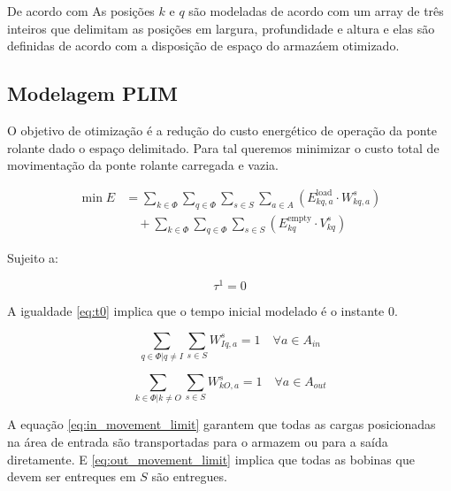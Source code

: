 \documentclass[journal]{IEEEtran}
\begin{document}
        De acordo com \cite{YUAN2017424} As posições $k$ e $q$ são modeladas de 
        acordo com um array de três inteiros que delimitam as posições em largura,
        profundidade e altura e elas são definidas de acordo com a disposição de
        espaço do armazáem otimizado. 

        \subsection{Modelagem PLIM}

        O objetivo de otimização é a redução do custo energético de operação da 
        ponte rolante dado o espaço delimitado. Para tal queremos minimizar o 
        custo total de movimentação da ponte rolante carregada e vazia.

        \begin{align*}
            \min E &= \sum_{k \in \Phi} \sum_{q \in \Phi} \sum_{s \in S} \sum_{a \in A} 
                    \left( E_{kq,a}^{\text{load}} \cdot W_{kq,a}^s \right) \\
                &\quad + \sum_{k \in \Phi} \sum_{q \in \Phi} \sum_{s \in S} 
                    \left( E_{kq}^{\text{empty}} \cdot V_{kq}^s \right)
            \label{eq:objetivo}
        \end{align*}


        Sujeito a:

        \begin{equation}
            \tau^{1} = 0
            \label{eq:t0}
        \end{equation}

        A igualdade \ref{eq:t0} implica que o tempo inicial modelado é o instante 0.

        \begin{equation}
            \sum_{q \in \Phi | q \neq I} \sum_{s \in S} W^s_{Iq,a} = 1 \quad \forall a \in A_{in} 
            \label{eq:in_movement_limit}
        \end{equation}

        \begin{equation}
            \sum_{k \in \Phi | k \neq O} \sum_{s \in S} W^s_{kO,a} = 1 \quad \forall a \in A_{out}
            \label{eq:out_movement_limit}
        \end{equation}

        A equação \ref{eq:in_movement_limit} 
        garantem que todas as cargas posicionadas na área de entrada são transportadas
        para o armazem ou para a saída diretamente. E  \ref{eq:out_movement_limit} 
        implica que todas as bobinas que devem ser entreques em $S$ são entregues.
\end{document}
